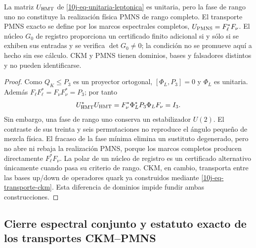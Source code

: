 \begin{proposition}
\label{10j-prop-ckm-pmns}
La matriz \(U_{\rm HMT}\) de \eqref{10j-eq-unitaria-leptonica} es unitaria,
pero la fase de rango uno no constituye la realización física PMNS de rango
completo. El transporte PMNS exacto se define por los marcos espectrales
completos, \(U_{\rm PMNS}=F_\ell^*F_\nu\). El núcleo \(G_0\) de registro
proporciona un certificado finito adicional si y sólo si se exhiben sus
entradas y se verifica \(\det G_0\ne0\); la condición no se promueve aquí a
hecho sin ese cálculo. CKM y PMNS tienen dominios, bases y falsadores distintos
y no pueden identificarse.
\end{proposition}

\begin{proof}
Como \(Q_K\leq P_3\) es un proyector ortogonal,
\([\Phi_L,P_3]=0\) y \(\Phi_L\) es unitaria. Además
\(F_\ell F_\ell^*=F_\nu F_\nu^*=P_3\); por tanto
\[
 U_{\rm HMT}^*U_{\rm HMT}
 =F_\nu^*\Phi_L^*P_3\Phi_LF_\nu=I_3.
\]
Sin embargo, una fase de rango uno conserva un estabilizador \(U(2)\). El
contraste de sus treinta y seis permutaciones no reproduce el ángulo pequeño
de mezcla física. El fracaso de la fase mínima elimina un sustituto degenerado,
pero no abre ni rebaja la realización PMNS, porque los marcos completos
producen directamente \(F_\ell^*F_\nu\). La polar de un núcleo de registro es
un certificado alternativo únicamente cuando pasa su criterio de rango. CKM,
en cambio, transporta entre las
bases up/down de operadores quark ya construidos mediante
\eqref{10j-eq-transporte-ckm}. Esta diferencia de dominios impide fundir
ambas construcciones.
\end{proof}

\subsection{Cierre espectral conjunto y estatuto exacto de los transportes CKM--PMNS}
\label{10j-sec-cierre-espectral-mezclas}

